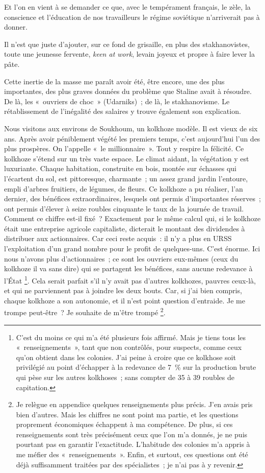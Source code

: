 \documentclass[french,twoside]{book} %
\begin{document}
Et l’on en vient à se demander ce que, avec le tempérament français, le zèle, la conscience et l’éducation de nos travailleurs le régime soviétique n’arriverait pas à donner.\par
Il n’est que juste d’ajouter, sur ce fond de grisaille, en plus des stakhanovistes, toute une jeunesse fervente, \emph{keen at work}, levain joyeux et propre à faire lever la pâte.\par
Cette inertie de la masse me paraît avoir été, être encore, une des plus importantes, des plus graves données du problème que Staline avait à résoudre. De là, les « ouvriers de choc » (Udarniks) ; de là, le stakhanovisme. Le rétablissement de l’inégalité des salaires y trouve également son explication.\par
Nous visitons aux environs de Soukhoum, un kolkhoze modèle. Il est vieux de six ans. Après avoir péniblement végété les premiers temps, c’est aujourd’hui l’un des plus prospères. On l’appelle « le millionnaire ». Tout y respire la félicité. Ce kolkhoze s’étend sur un très vaste espace. Le climat aidant, la végétation y est luxuriante. Chaque habitation, construite en bois, montée sur échasses qui l’écartent du sol, est pittoresque, charmante ; un assez grand jardin l’entoure, empli d’arbres fruitiers, de légumes, de fleurs. Ce kolkhoze a pu réaliser, l’an dernier, des bénéfices extraordinaires, lesquels ont permis d’importantes réserves ; ont permis d’élever à seize roubles cinquante le taux de la journée de travail. Comment ce chiffre est-il fixé ? Exactement par le même calcul qui, si le kolkhoze était une entreprise agricole capitaliste, dicterait le montant des dividendes à distribuer aux actionnaires. Car ceci reste acquis : il n’y a plus en URSS l’exploitation d’un grand nombre pour le profit de quelques-uns. C’est énorme. Ici nous n’avons plus d’actionnaires ; ce sont les ouvriers eux-mêmes (ceux du kolkhoze il va sans dire) qui se partagent les bénéfices, sans aucune redevance à l’État \footnote{C’est du moins ce qui m’a été plusieurs fois affirmé. Mais je tiens tous les « renseignements », tant que non contrôlés, pour suspects, comme ceux qu’on obtient dans les colonies. J’ai peine à croire que ce kolkhose soit privilégié au point d’échapper à la redevance de 7 \% sur la production brute qui pèse sur les autres kolkhoses ; sans compter de 35 à 39 roubles de capitation.}. Cela serait parfait s’il n’y avait pas d’autres kolkhozes, pauvres ceux-là, et qui ne parviennent pas à joindre les deux bouts. Car, si j’ai bien compris, chaque kolkhoze a son autonomie, et il n’est point question d’entraide. Je me trompe peut-être ? Je souhaite de m’être trompé \footnote{Je relègue en appendice quelques renseignements plus précis. J’en avais pris bien d’autres. Mais les chiffres ne sont point ma partie, et les questions proprement économiques échappent à ma compétence. De plus, si ces renseignements sont très précisément ceux que l’on m’a donnés, je ne puis pourtant pas en garantir l’exactitude. L’habitude des colonies m’a appris à me méfier des « renseignements ». Enfin, et surtout, ces questions ont été déjà suffisamment traitées par des spécialistes ; je n’ai pas à y revenir.}.\par
\end{document}

